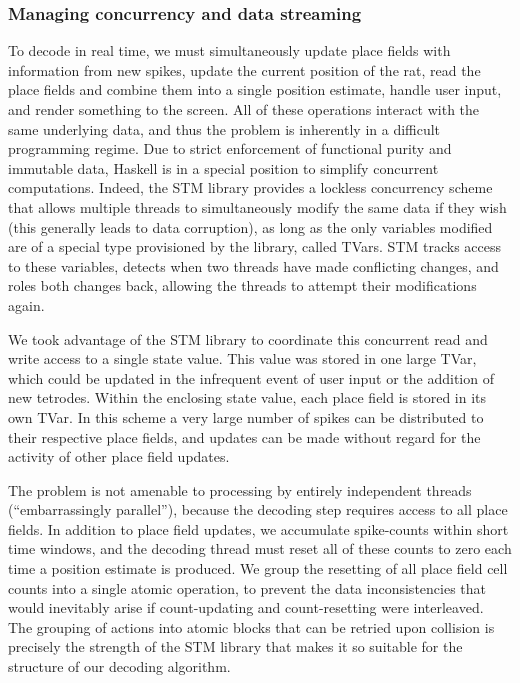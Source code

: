 \documentclass[]{article}
\begin{document}
\subsubsection{Managing concurrency and data streaming}

To decode in real time, we must simultaneously update place fields with
information from new spikes, update the current position of the rat,
read the place fields and combine them into a single position estimate,
handle user input, and render something to the screen. All of these
operations interact with the same underlying data, and thus the problem
is inherently in a difficult programming regime. Due to strict
enforcement of functional purity and immutable data, Haskell is in a
special position to simplify concurrent computations. Indeed, the STM
library provides a lockless concurrency scheme that allows multiple
threads to simultaneously modify the same data if they wish (this
generally leads to data corruption), as long as the only variables
modified are of a special type provisioned by the library, called TVars.
STM tracks access to these variables, detects when two threads have made
conflicting changes, and roles both changes back, allowing the threads
to attempt their modifications again.

We took advantage of the STM library to coordinate this concurrent read
and write access to a single state value. This value was stored in one
large TVar, which could be updated in the infrequent event of user input
or the addition of new tetrodes. Within the enclosing state value, each
place field is stored in its own TVar. In this scheme a very large
number of spikes can be distributed to their respective place fields,
and updates can be made without regard for the activity of other place
field updates.

The problem is not amenable to processing by entirely independent
threads (``embarrassingly parallel''), because the decoding step
requires access to all place fields. In addition to place field updates,
we accumulate spike-counts within short time windows, and the decoding
thread must reset all of these counts to zero each time a position
estimate is produced. We group the resetting of all place field cell
counts into a single atomic operation, to prevent the data
inconsistencies that would inevitably arise if count-updating and
count-resetting were interleaved. The grouping of actions into atomic
blocks that can be retried upon collision is precisely the strength of
the STM library that makes it so suitable for the structure of our
decoding algorithm.
\end{document}
